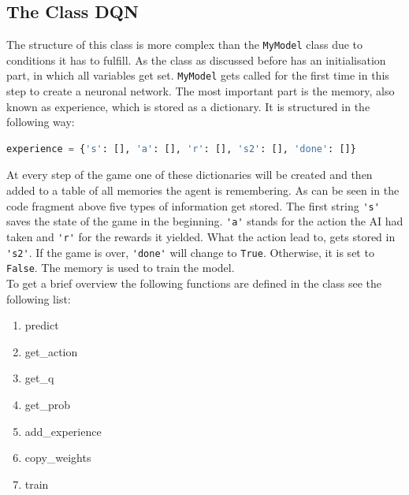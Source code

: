 \documentclass[12pt]{article}
\begin{document}
\subsection{The Class DQN}\label{ssec:DQN}
The structure of this class is more complex than the \lstinline{MyModel} class due to conditions it has to fulfill. As the class as discussed before has an initialisation part, in which all variables get set. \lstinline{MyModel} gets called for the first time in this step to create a \gls{neuronal network}. The most important part is the \gls{memory}, also known as \gls{experience}, which is stored as a dictionary. It is structured in the following way:
\begin{lstlisting}[language=Python, caption = Example - The \gls{memory} of the \gls{neuronal network}]
experience = {'s': [], 'a': [], 'r': [], 's2': [], 'done': []}
\end{lstlisting}
At every step of the game one of these dictionaries will be created and then added to a table of all memories the agent is remembering.
As can be seen in the code fragment above five types of information get stored. The first string \lstinline{'s'} saves the \gls{state} of the game in the beginning. \lstinline{'a'} stands for the action the \gls{AI} had taken and \lstinline{'r'} for the \glspl{reward} it yielded. What the action lead to, gets stored in \lstinline{'s2'}. If the game is over, \lstinline{'done'} will change to \lstinline{True}. Otherwise, it is set to \lstinline{False}. The \gls{memory} is used to train the model. \\ To get a brief overview the following functions are defined in the class see the following list:
\begin{enumerate}
    \item predict
    \item get\_action
    \item get\_q
    \item get\_prob
    \item add\_experience
    \item copy\_weights
    \item train
\end{enumerate}
\end{document}
